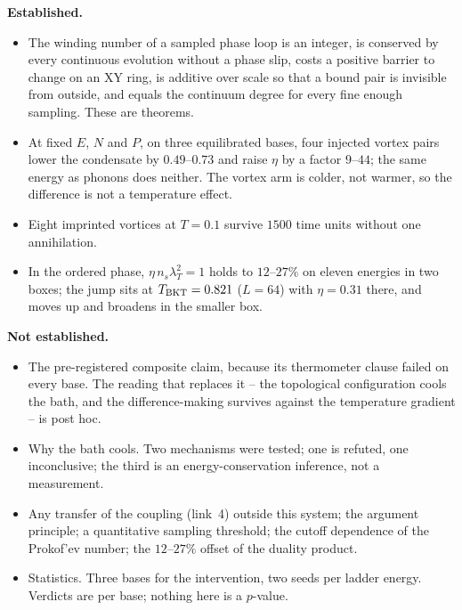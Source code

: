 \documentclass[11pt,a4paper]{article}
\begin{document}
\begin{keybox}
\textbf{Established.}
\begin{itemize}[leftmargin=*]
\item The winding number of a sampled phase loop is an integer, is conserved by every continuous
  evolution without a phase slip, costs a positive barrier to change on an XY ring, is additive over
  scale so that a bound pair is invisible from outside, and equals the continuum degree for every fine
  enough sampling. These are theorems.
\item At fixed $E$, $N$ and $P$, on three equilibrated bases, four injected vortex pairs lower the
  condensate by $0.49$--$0.73$ and raise $\eta$ by a factor $9$--$44$; the same energy as phonons does
  neither. The vortex arm is colder, not warmer, so the difference is not a temperature effect.
\item Eight imprinted vortices at $T=0.1$ survive $1500$ time units without one annihilation.
\item In the ordered phase, $\eta\,n_s\lambda_T^2=1$ holds to $12$--$27\%$ on eleven energies in two
  boxes; the jump sits at $T_{\rm BKT}=0.821$ ($L=64$) with $\eta=0.31$ there, and moves up and
  broadens in the smaller box.
\end{itemize}
\end{keybox}

\begin{failbox}
\textbf{Not established.}
\begin{itemize}[leftmargin=*]
\item The pre-registered composite claim, because its thermometer clause failed on every base. The
  reading that replaces it -- the topological configuration cools the bath, and the difference-making
  survives against the temperature gradient -- is post hoc.
\item Why the bath cools. Two mechanisms were tested; one is refuted, one inconclusive; the third is
  an energy-conservation inference, not a measurement.
\item Any transfer of the coupling (link~4) outside this system; the argument principle; a
  quantitative sampling threshold; the cutoff dependence of the Prokof'ev number; the $12$--$27\%$
  offset of the duality product.
\item Statistics. Three bases for the intervention, two seeds per ladder energy. Verdicts are per
  base; nothing here is a $p$-value.
\end{itemize}
\end{failbox}
\end{document}
